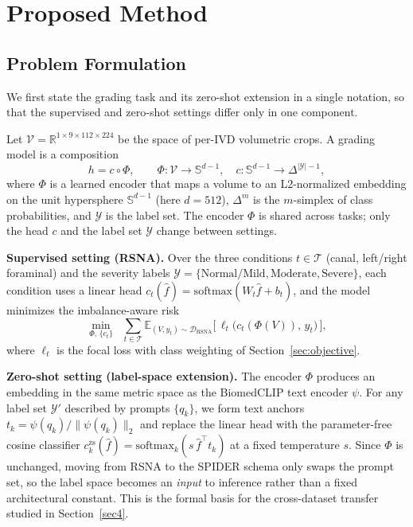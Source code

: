 \documentclass[runningheads]{llncs}
\begin{document}
\section{Proposed Method}\label{sec3}

\subsection{Problem Formulation}\label{sec:formulation}

We first state the grading task and its zero-shot extension in a single notation, so that the supervised and zero-shot settings differ only in one component.

Let $\mathcal{V} = \mathbb{R}^{1 \times 9 \times 112 \times 224}$ be the space of per-IVD volumetric crops. A grading model is a composition
\begin{equation}
h = c \circ \Phi, \qquad \Phi : \mathcal{V} \to \mathbb{S}^{d-1}, \quad c : \mathbb{S}^{d-1} \to \Delta^{|\mathcal{Y}|-1},
\label{eq:composition}
\end{equation}
where $\Phi$ is a learned encoder that maps a volume to an L2-normalized embedding on the unit hypersphere $\mathbb{S}^{d-1}$ (here $d = 512$), $\Delta^{m}$ is the $m$-simplex of class probabilities, and $\mathcal{Y}$ is the label set. The encoder $\Phi$ is shared across tasks; only the head $c$ and the label set $\mathcal{Y}$ change between settings.

\textbf{Supervised setting (RSNA).} Over the three conditions $t \in \mathcal{T}$ (canal, left/right foraminal) and the severity labels $\mathcal{Y} = \{\text{Normal/Mild},\text{Moderate},\text{Severe}\}$, each condition uses a linear head $c_t(\hat f) = \mathrm{softmax}(W_t \hat f + b_t)$, and the model minimizes the imbalance-aware risk
\begin{equation}
\min_{\Phi,\,\{c_t\}} \;\; \sum_{t \in \mathcal{T}} \mathbb{E}_{(V, y_t) \sim \mathcal{D}_{\text{RSNA}}} \big[\, \ell_t\big(c_t(\Phi(V)),\, y_t\big)\,\big],
\label{eq:erm}
\end{equation}
where $\ell_t$ is the focal loss with class weighting of Section~\ref{sec:objective}.

\textbf{Zero-shot setting (label-space extension).} The encoder $\Phi$ produces an embedding in the same metric space as the BiomedCLIP text encoder $\psi$. For any label set $\mathcal{Y}'$ described by prompts $\{q_k\}$, we form text anchors $t_k = \psi(q_k)/\|\psi(q_k)\|_2$ and replace the linear head with the parameter-free cosine classifier $c^{\text{zs}}_k(\hat f) = \mathrm{softmax}_k(s\,\hat f^{\top} t_k)$ at a fixed temperature $s$. Since $\Phi$ is unchanged, moving from RSNA to the SPIDER schema only swaps the prompt set, so the label space becomes an \emph{input} to inference rather than a fixed architectural constant. This is the formal basis for the cross-dataset transfer studied in Section~\ref{sec4}.
\end{document}
